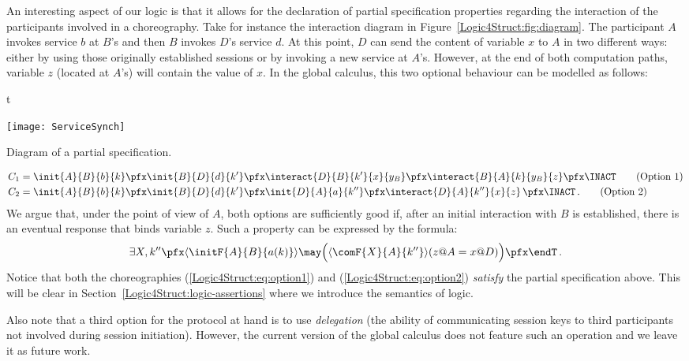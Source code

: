\begin{example}

 An interesting aspect of our logic is that it allows for the
  declaration of partial specification properties regarding the
  interaction of the participants involved in a choreography. Take for
  instance the interaction diagram in Figure~\ref{Logic4Struct:fig:diagram}.  The
  participant $A$ invokes service $b$ at $B$'s and then $B$ invokes
  $D$'s service $d$.  At this point, $D$ can send the content of
  variable $x$ to $A$ in two different ways: either by using those
  originally established sessions or by invoking a new service at
  $A$'s. However, at the end of both computation paths, variable $z$
  (located at $A$'s) will contain the value of $x$. In the global
  calculus, this two optional behaviour can be modelled as follows:
  \begin{myfigure}{t}\vspace{1cm}
    \begin{center}
      \texttt{[image: ServiceSynch]}
    \end{center}
    \caption{Diagram of a partial specification.}
    \label{Logic4Struct:fig:diagram}
  \end{myfigure}

  \begin{align}
    C_1 & = \init{A}{B}{b}{k} \pfx \init{B}{D}{d}{k'} \pfx
    \interact{D}{B}{k'}{x}{y_B}\pfx\interact{B}{A}{k}{y_B}{z} \pfx \INACT 
    \label{Logic4Struct:eq:option1} \tag{Option 1} \\
    C_2 & = \init{A}{B}{b}{k} \pfx \init{B}{D}{d}{k'} \pfx
     \init{D}{A}{a}{k''}\pfx \interact{D}{A}{k''}{x}{z} \, \pfx \INACT \, .
     \label{Logic4Struct:eq:option2} \tag{Option 2}
  \end{align}
  We argue that, under the point of view of $A$, both options are
  sufficiently good if, after an initial interaction with $B$ is
  established, there is an eventual response that binds variable
  $z$. Such a property can be expressed by the \GL formula:
  \begin{equation*}
    \exists X,{k''}\pfx \langle\initF{A}{B}{a(k)} \rangle
    \may \Big(\langle \comF{X}{A}{k''}\rangle (z@A=x@D) \Big) \pfx \endT \, .
  \end{equation*}
  Notice that both the choreographies (\ref{Logic4Struct:eq:option1}) and
  (\ref{Logic4Struct:eq:option2}) \emph{satisfy} the partial specification
  above. This will be clear in Section~\ref{Logic4Struct:logic-assertions} where we
  introduce the semantics of logic.

  Also note that a third option for the protocol at hand is to use
  \emph{delegation} (the ability of communicating session keys to
  third participants not involved during session initiation). However,
  the current version of the global calculus does not feature such an
  operation and we leave it as future work.
\end{example}

